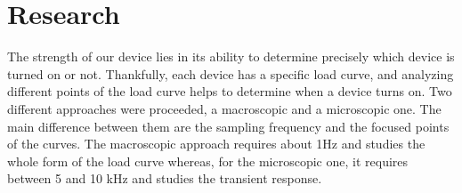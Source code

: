 %
%
\section{Research}

The strength of our device lies in its ability to determine precisely which device is turned on or not. Thankfully, each device has a specific load curve, and analyzing different points of the load curve helps to determine when a device turns on. Two different approaches were proceeded, a macroscopic and a microscopic one. The main difference between them are the sampling frequency and the focused points of the curves. The macroscopic approach requires about 1Hz and studies the whole form of the load curve whereas, for the microscopic one, it requires between 5 and 10 kHz and studies the transient response.





